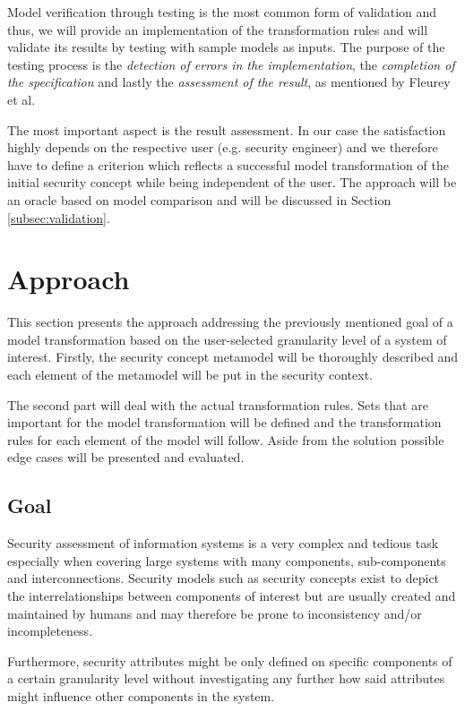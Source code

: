 Model verification through testing is the most common form of validation \cite{fleurey} and thus, we will provide an implementation of the transformation rules and will validate its results by testing with sample models as inputs. The purpose of the testing process is the \textit{detection of errors in the implementation}, the \textit{completion of the specification} and lastly the \textit{assessment of the result}, as mentioned by Fleurey et al.

The most important aspect is the result assessment. In our case the satisfaction highly depends on the respective user (e.g. security engineer) and we therefore have to define a criterion which reflects a successful model transformation of the initial security concept while being independent of the user. The approach will be an oracle based on model comparison and will be discussed in Section \ref{subsec:validation}.
 
\section{Approach}
\label{sec:approach}

This section presents the approach addressing the previously mentioned goal of a model transformation based on the user-selected granularity level of a system of interest. Firstly, the security concept metamodel will be thoroughly described and each element of the metamodel will be put in the security context.

The second part will deal with the actual transformation rules. Sets that are important for the model transformation will be defined and the transformation rules for each element of the model will follow. Aside from the solution possible edge cases will be presented and evaluated.

\subsection{Goal}
\label{subsec:goal}

Security assessment of information systems is a very complex and tedious task especially when covering large systems with many components, sub-components and interconnections. Security models such as security concepts exist to depict the interrelationships between components of interest but are usually created and maintained by humans and may therefore be prone to inconsistency and/or incompleteness.

Furthermore, security attributes might be only defined on specific components of a certain granularity level without investigating any further how said attributes might influence other components in the system. 

